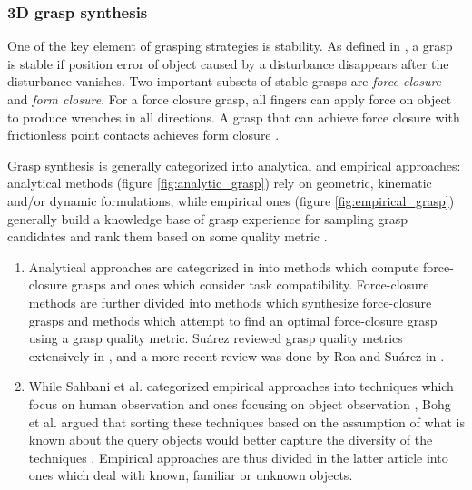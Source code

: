 \documentclass[12pt]{article}
\begin{document}
    \subsubsection{3D grasp synthesis}

    One of the key element of grasping strategies is stability. As defined in \cite{Roa2015}, a grasp is stable if position error of object caused by a disturbance disappears after the disturbance vanishes. Two important subsets of stable grasps are \emph{force closure} and \emph{form closure}. For a force closure grasp, all fingers can apply force on object to produce wrenches in all directions. A grasp that can achieve force closure with frictionless point contacts achieves form closure \cite{Sahbani2012}.

    Grasp synthesis is generally categorized into analytical and empirical approaches: analytical methods (figure \ref{fig:analytic_grasp}) rely on geometric, kinematic and/or dynamic formulations, while empirical ones (figure \ref{fig:empirical_grasp}) generally build a knowledge base of grasp experience for sampling grasp candidates and rank them based on some quality metric \cite{Sahbani2012,Bohg2014}.

    \begin{enumerate}
        \item Analytical approaches are categorized in \cite{Sahbani2012} into methods which compute force-closure grasps and ones which consider task compatibility. Force-closure methods are further divided into methods which synthesize force-closure grasps and methods which attempt to find an optimal force-closure grasp using a grasp quality metric. Su\'{a}rez reviewed grasp quality metrics extensively in \cite{suarez2006}, and a more recent review was done by Roa and Su\'{a}rez in \cite{Roa2015}.
        \item While Sahbani et al. categorized empirical approaches into techniques which focus on human observation and ones focusing on object observation \cite{Sahbani2012}, Bohg et al. argued that sorting these techniques based on the assumption of what is known about the query objects would better capture the diversity of the techniques \cite{Bohg2014}. Empirical approaches are thus divided in the latter article into ones which deal with known, familiar or unknown objects.
    \end{enumerate}
\end{document}
